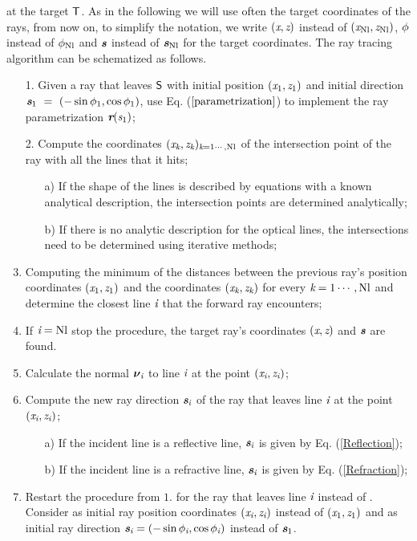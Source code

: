  at the target $\textsf{T}$. As in the following we will use often the target coordinates of the rays, from now on, to simplify the notation, we write $(\textit{x},\textit{z})$ instead of $(\textit{x}_{\textrm{Nl}}, \textit{z}_{\textrm{Nl}})$,  $\phi$ instead of $\phi_{\textrm{Nl}}$ and $\textit{\textbf{s}}$ instead of $\textit{\textbf{s}}_{\textrm{Nl}}$ for the target coordinates. 
The ray tracing algorithm can be schematized as follows.
\begin{enumerate}
 \item[1. ] Given a ray that leaves $\textsf{S}$ with initial position $(\textit{x}_1, \textit{z}_1)$ and initial direction $\textit{\textbf{s}}_1~=~(-\sin \phi_1, \cos \phi_1)$, use Eq. ($\ref{parametrization}$) to implement the ray parametrization $\textit{\textbf{r}}(\textit{s}_1)$;
\item[2. ] Compute the coordinates $(\textit{x}_{\textit{k}}, \textit{z}_{\textit{k}})_{\textit{k} = 1\cdots, \textrm{Nl}}$ of the intersection point of the ray with all the lines that it hits;
\begin{itemize}
\item[a)] If the shape of the lines is described by equations with a known analytical description, the intersection points are determined analytically;
\item[b)] If there is no analytic description for the optical lines, the intersections need to be determined using iterative methods;
\end{itemize}
\item  Computing the minimum of the distances between the previous ray's position coordinates $(\textit{x}_1, \textit{z}_1)$ and the coordinates $(\textit{x}_{\textit{k}}, \textit{z}_{\textit{k}})$ for every ${\textit{k} = 1\cdots, \textrm{Nl}}$ and determine the closest line $\textit{i}$ that the forward ray encounters;
\item If $\textit{i} = \textrm{Nl}$ stop the procedure, the target ray's coordinates $(\textit{x}, \textit{z})$ and $\textit{\textbf{s}}$ are found.
\item Calculate the normal $\boldsymbol{\nu}_{\textit{i}}$ to line $\textit{i}$ at the point $(\textit{x}_{\textit{i}}, \textit{z}_{\textit{i}})$;
 \item Compute the new ray direction $\textit{\textbf{s}}_{\textit{i}}$ of the ray that leaves line $\textit{i}$ at the point $(\textit{x}_{\textit{i}}, \textit{z}_{\textit{i}})$;
\begin{itemize}
\item[a)] If the incident line is a reflective line, $\textit{\textbf{s}}_{\textit{i}}$ is given by Eq. (\ref{Reflection});
\item[b)] If the incident line is a refractive line, $\textit{\textbf{s}}_{\textit{i}}$ is given by Eq. (\ref{Refraction});
\end{itemize}
\item Restart the procedure from $1.$ for the ray that leaves line $\textit{i}$ instead of . Consider as initial ray position coordinates $(\textit{x}_{\textit{i}}, \textit{z}_{\textit{i}})$ instead of $(\textit{x}_1, \textit{z}_1)$ and as initial ray direction $\textit{\textbf{s}}_{\textit{i}}= (-\sin \phi_{\textit{i}}, \cos \phi_{\textit{i}})$ instead of $\textit{\textbf{s}}_1$.
\end{enumerate}
